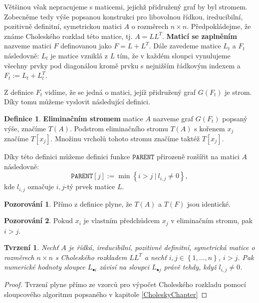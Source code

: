 \documentclass[11pt,american,czech,oneside]{book}
\theoremstyle{plain}
\newtheorem{proposition}{Tvrzení}
\theoremstyle{definition}
\newtheorem{definition}{Definice}
\newtheorem{observation}{Pozorování}
\begin{document}
Většinou však nepracujeme s maticemi, jejichž přidružený graf by byl stromem. Zobecněme tedy výše popsanou konstrukci pro libovolnou řídkou, ireducibilní, pozitivně definitní, symetrickou matici $A$ o rozměrech $n \times n$. Předpokládejme, že známe Choleského rozklad této matice, tj. $A = LL^T$. \textbf{Maticí se zaplněním} nazveme matici $F$ definovanou jako $F = L + L^T$. Dále zavedeme matice $L_t$ a $F_t$ následovně: $L_t$ je matice vzniklá z $L$ tím, že v každém sloupci vynulujeme všechny prvky pod diagonálou
kromě prvku s nejnižším řádkovým indexem a $F_t := L_t + L_t^T$.

Z definice $F_t$ vidíme, že se jedná o matici, jejíž přidružený graf $G(F_t)$ je strom. Díky tomu můžeme vyslovit následující definici.

\begin{definition}
    \textbf{Eliminačním stromem} matice $A$ nazveme graf $G(F_t)$ popsaný výše, značíme $T(A)$.
    Podstrom eliminačního stromu $T(A)$ s kořenem $x_j$ značíme $T[x_j]$. Množinu vrcholů tohoto stromu značíme taktéž $T[x_j]$.
\end{definition}

Díky této definici můžeme definici funkce $\texttt{PARENT}$ přirozeně rozšířit na matici $A$ následovně:
\[
    \texttt{PARENT}[j] := \min \left\{ i > j \ | \ l_{i,j} \neq 0\right\},
\]
kde $l_{i,j}$ označuje $i,j$-tý prvek matice $L$.

\begin{observation}
Přímo z definice plyne, že $T(A)$ a $T(F)$ jsou identické.
\end{observation}

\begin{observation}
Pokud $x_i$ je vlastním předchůdcem $x_j$ v eliminačním stromu, pak $i > j$.
\end{observation}

\begin{proposition}
  \label{ColDepProposition}
  Nechť $A$ je řídká, ireducibilní, pozitivně definitní, symetrická matice o rozměrech $n \times n$ s Choleského rozkladem $LL^T$ a nechť $i,j \in \left\{1,\ldots,n \right\}$, $i > j$. Pak numerické hodnoty sloupce $L_{\bullet i}$ závisí na sloupci $L_{\bullet j}$ právě tehdy,
  když $l_{i,j} \neq 0$.
\end{proposition}
\begin{proof}
  Tvrzení plyne přímo ze vzorců pro výpočet Choleského rozkladu pomocí sloupcového algoritmu popsaného v kapitole \ref{CholeskyChapter}
\end{proof}
\end{document}
